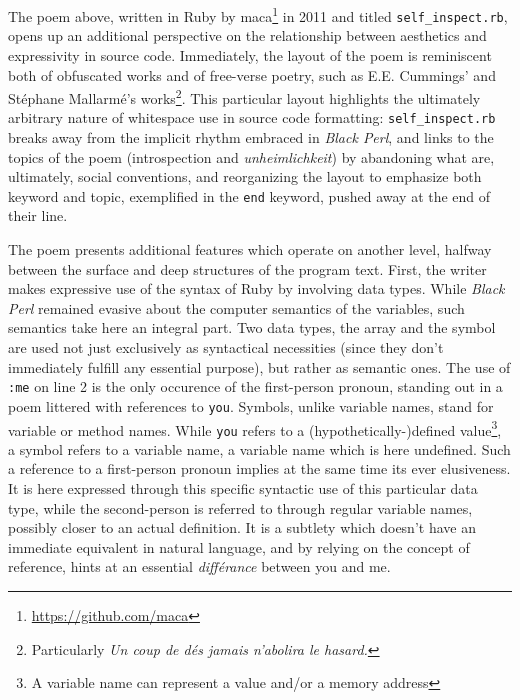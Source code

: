 \documentclass{article}
\begin{document}
The poem above, written in Ruby by maca\footnote{\url{https://github.com/maca}} in 2011 and titled \lstinline{self_inspect.rb}, opens up an additional perspective on the relationship between aesthetics and expressivity in source code. Immediately, the layout of the poem is reminiscent both of obfuscated works and of free-verse poetry, such as E.E. Cummings' and Stéphane Mallarmé's works\footnote{Particularly \emph{Un coup de dés jamais n'abolira le hasard.}}. This particular layout highlights the ultimately arbitrary nature of whitespace use in source code formatting: \lstinline{self_inspect.rb} breaks away from the implicit rhythm embraced in \emph{Black Perl}, and links to the topics of the poem (introspection and \emph{unheimlichkeit}) by abandoning what are, ultimately, social conventions, and reorganizing the layout to emphasize both keyword and topic, exemplified in the \lstinline{end} keyword, pushed away at the end of their line.

The poem presents additional features which operate on another level, halfway between the surface and deep structures of the program text. First, the writer makes expressive use of the syntax of Ruby by involving data types. While \emph{Black Perl} remained evasive about the computer semantics of the variables, such semantics take here an integral part. Two data types, the array and the symbol are used not just exclusively as syntactical necessities (since they don't immediately fulfill any essential purpose), but rather as semantic ones. The use of \lstinline{:me} on line 2 is the only occurence of the first-person pronoun, standing out in a poem littered with references to \lstinline{you}. Symbols, unlike variable names, stand for variable or method names. While \lstinline{you} refers to a (hypothetically-)defined value\footnote{A variable name can represent a value and/or a memory address}, a symbol refers to a variable name, a variable name which is here undefined. Such a reference to a first-person pronoun implies at the same time its ever elusiveness. It is here expressed through this specific syntactic use of this particular data type, while the second-person is referred to through regular variable names, possibly closer to an actual definition. It is a subtlety which doesn't have an immediate equivalent in natural language, and by relying on the concept of reference, hints at an essential \emph{différance} between you and me.
\end{document}
